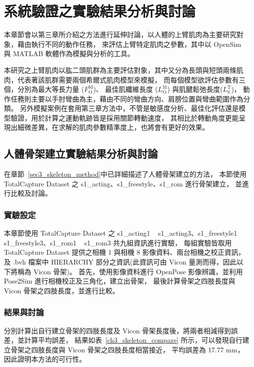 \chapter{系統驗證之實驗結果分析與討論}
\fontsize{12pt}{18pt}\selectfont %

本章節會以第三章所介紹之方法進行延伸討論，以人體的上臂肌肉為主要研究對象，藉由執行不同的動作任務，
來評估上臂特定肌肉之參數，其中以 OpenSim 與 MATLAB 軟體作為模擬與分析的工具。

本研究之上臂肌肉以肱二頭肌群為主要評估對象，其中又分為長頭與短頭兩條肌肉，代表著該肌群需要兩個希爾式肌肉模型來模擬，
而每個模型欲評估參數有三個，分別為最大等長力量 ($F^\mathrm{M}_\mathrm{O}$)、
最佳肌纖維長度 ($L^\mathrm{M}_\mathrm{O}$) 與肌腱鬆弛長度($L^\mathrm{T}_\mathrm{S}$)，
動作任務則主要以手肘彎曲為主，藉由不同的彎曲方向、肩膀位置與彎曲範圍作為分類。
另外模擬案例在套用第三章方法中，不管是敏感度分析、最佳化評估還是模型驗證，用於計算之運動軌跡皆是採用關節轉動速度，
其相比於轉動角度更能呈現出細微差異，在求解的肌肉參數精準度上，也將會有更好的效果。

\section{人體骨架建立實驗結果分析與討論}\label{sec4_skeleton_exp}
在章節~\ref{sec3_skeleton_method}中已詳細描述了人體骨架建立的方法，
本節使用 TotalCapture Dataset 之 s1\_acting、s1\_freestyle、s1\_rom 進行骨架建立，
並進行比較及討論。

\subsection{實驗設定}
本章節使用 TotalCapture Dataset 之 s1\_acting1 ~ s1\_acting3、s1\_freestyle1 ~ s1\_freestyle3、s1\_rom1 ~ s1\_rom3 共九組資訊進行實驗，
每組實驗皆取用 TotalCapture Dataset 提供之相機 1 與相機 8 影像資料、兩台相機之校正資訊，
及 .bvh 檔案中 HIERARCHY 部分之資訊(此資訊可由 Vicon 量測而得，因此以下將稱為 Vicon 骨架)。
首先，使用影像資料進行 OpenPose 影像辨識，並利用 Pose2Sim 進行相機校正及三角化，建立出骨架，
最後計算骨架之四肢長度與 Vicon 骨架之四肢長度，並進行比較。

\subsection{結果與討論}
分別計算出自行建立骨架的四肢長度及 Vicon 骨架長度後，將兩者相減得到誤差，並計算平均誤差，
結果如表~\ref{ch3_skeleton_compare} 所示，可以發現自行建立骨架之四肢長度與 Vicon 骨架之四肢長度相當接近，
平均誤差為 17.77 mm，因此證明本方法的可行性。

